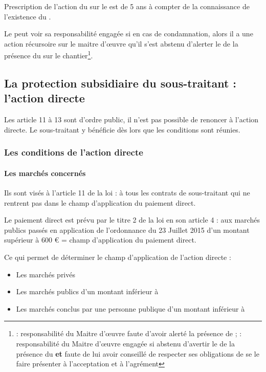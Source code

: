 				Prescription de l’action du \ST sur le \MO est de 5 ans à compter de la connaissance de l’existence du \ST.

				Le \MO peut voir sa responsabilité engagée si en cas de condamnation, alors il a une action récursoire sur le maitre d’œuvre qu’il s’est abstenu d’alerter le \MO de la présence du \ST sur le chantier\footnote{ : responsabilité du Maitre d’œuvre faute d’avoir alerté la présence de \ST ;  : responsabilité du Maitre d’œuvre engagée si abstenu d’avertir le \MO de la présence du \ST \textbf{et} faute de lui avoir conseillé de respecter ses obligations \cad de se le faire présenter à l’acceptation et à l’agrément}.



	\subsection{La protection subsidiaire du sous-traitant : l'action directe}

		Les article 11 à 13
sont d'ordre public, il n'est pas possible de renoncer à l’action directe. Le sous-traitant y bénéficie dès lors que les conditions sont réunies.

		\subsubsection{Les conditions de l'action directe}

			\paragraph{Les marchés concernés}

				Ils sont visés à l'article 11 de la loi : à tous les contrats de sous-traitant qui ne rentrent pas dans le champ d’application du paiement direct.

				Le paiement direct est prévu par le titre 2 de la loi en son article 4 : aux marchés publics passés en application de l’ordonnance du 23 Juillet 2015 d’un montant supérieur à 600 € = champ d’application du paiement direct. \aVerifier

				\medbreak Ce qui permet de déterminer le champ d’application de l’action directe :

				\begin{itemize}
					\item Les marchés privés

					\item Les marchés publics d’un montant inférieur à 
					\item Les marchés conclus par une personne publique d’un montant inférieur à 

				\end{itemize}

